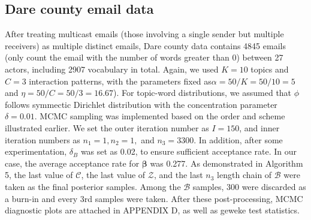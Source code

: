 \documentclass[a4paper]{article}
\begin{document}

\subsection{Dare county email data}
After treating multicast emails (those involving a single sender but multiple receivers) as multiple distinct emails, Dare county data contains 4845 emails (only count the email with the number of words greater than 0) between 27 actors, including 2907 vocabulary in total. Again, we used $K=10$ topics and $C=3$ interaction patterns, with the parameters fixed as$\alpha=50/K=50/10=5$ and $\eta = 50/C=50/3=16.67$). For topic-word distributions, we assumed that $\phi$ follows symmectic Dirichlet distribution with the concentration parameter $\delta=0.01$. MCMC sampling was implemented based on the order and scheme illustrated earlier. We set the outer iteration number as $I=150$, and inner iteration numbers as $n_1=1, n_2=1,$ and $n_3=3300$. In addition, after some experimentation, $\delta_B$ was set as 0.02, to ensure sufficient acceptance rate. In our case, the average acceptance rate for $\boldsymbol{\beta}$ was 0.277. As demonstrated in Algorithm 5, the last value of $\mathcal{C}$, the last value of $\mathcal{Z}$, and the last $n_3$ length chain of $\mathcal{B}$ were taken as the final posterior samples. Among the $\mathcal{B}$ samples, 300 were discarded as a burn-in and every 3rd samples were taken. After these post-processing, MCMC diagnostic plots are attached in APPENDIX D, as well as geweke test statistics.
		\clearpage
\end{document}
